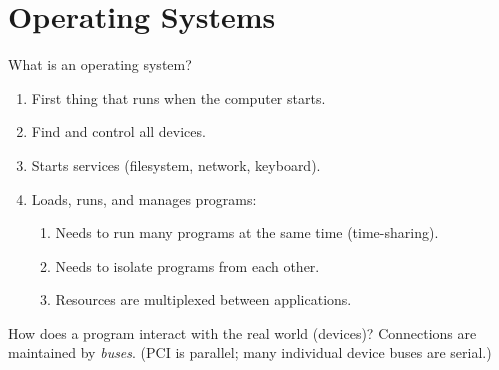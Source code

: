 \chapter{Operating Systems}
What is an operating system?
\begin{enumerate}
	\item First thing that runs when the computer starts.
	\item Find and control all devices.
	\item Starts services (filesystem, network, keyboard).
	\item Loads, runs, and manages programs:
	\begin{enumerate}
		\item Needs to run many programs at the same time (time-sharing).
		\item Needs to isolate programs from each other.
		\item Resources are multiplexed between applications.
	\end{enumerate}
\end{enumerate}

How does a program interact with the real world (devices)? Connections are maintained by \emph{buses}. (PCI is parallel; many individual device buses are serial.)


